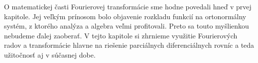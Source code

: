 O matematickej časti Fourierovej transformácie sme hodne povedali hneď
v prvej kapitole. Jej veľkým prínosom bolo objavenie rozkladu funkcií
na ortonormálny systém, z ktorého analýza a algebra veľmi profitovali.
Preto sa touto myšlienkou nebudeme ďalej zaoberať. V tejto kapitole si
zhrnieme využitie Fourierových radov a transformácie hlavne na
riešenie parciálnych diferenciálnych rovníc a teda užitočnosť aj v
súčasnej dobe.
